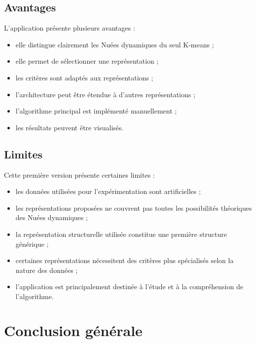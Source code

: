 \documentclass[12pt,a4paper]{report}
\begin{document}
\section{Avantages}

L'application présente plusieurs avantages :

\begin{itemize}
    \item elle distingue clairement les Nuées dynamiques du seul
    K-means ;
    \item elle permet de sélectionner une représentation ;
    \item les critères sont adaptés aux représentations ;
    \item l'architecture peut être étendue à d'autres représentations ;
    \item l'algorithme principal est implémenté manuellement ;
    \item les résultats peuvent être visualisés.
\end{itemize}

\section{Limites}

Cette première version présente certaines limites :

\begin{itemize}
    \item les données utilisées pour l'expérimentation sont artificielles ;
    \item les représentations proposées ne couvrent pas toutes les
    possibilités théoriques des Nuées dynamiques ;
    \item la représentation structurelle utilisée constitue une
    première structure générique ;
    \item certaines représentations nécessitent des critères plus
    spécialisés selon la nature des données ;
    \item l'application est principalement destinée à l'étude et à
    la compréhension de l'algorithme.
\end{itemize}


\chapter*{Conclusion générale}
\end{document}
